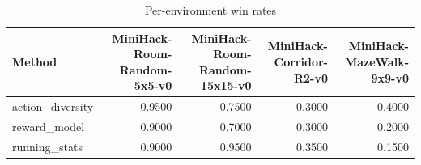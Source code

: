 \begin{table}[htbp]
\centering
\caption{Per-environment win rates}
\label{tab:per-env}
\begin{tabular}{lrrrr}
\toprule
\textbf{Method} & \textbf{MiniHack-Room-Random-5x5-v0} & \textbf{MiniHack-Room-Random-15x15-v0} & \textbf{MiniHack-Corridor-R2-v0} & \textbf{MiniHack-MazeWalk-9x9-v0} \\
\midrule
action\_diversity & 0.9500 & 0.7500 & 0.3000 & 0.4000 \\
reward\_model & 0.9000 & 0.7000 & 0.3000 & 0.2000 \\
running\_stats & 0.9000 & 0.9500 & 0.3500 & 0.1500 \\
\bottomrule
\end{tabular}
\end{table}